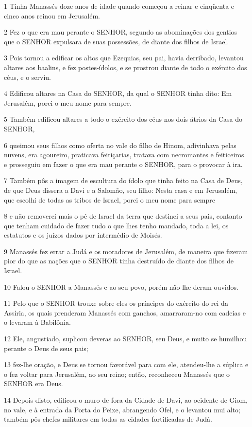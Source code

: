 \par 1 Tinha Manassés doze anos de idade quando começou a reinar e cinqüenta e cinco anos reinou em Jerusalém.
\par 2 Fez o que era mau perante o SENHOR, segundo as abominações dos gentios que o SENHOR expulsara de suas possessões, de diante dos filhos de Israel.
\par 3 Pois tornou a edificar os altos que Ezequias, seu pai, havia derribado, levantou altares aos baalins, e fez postes-ídolos, e se prostrou diante de todo o exército dos céus, e o serviu.
\par 4 Edificou altares na Casa do SENHOR, da qual o SENHOR tinha dito: Em Jerusalém, porei o meu nome para sempre.
\par 5 Também edificou altares a todo o exército dos céus nos dois átrios da Casa do SENHOR,
\par 6 queimou seus filhos como oferta no vale do filho de Hinom, adivinhava pelas nuvens, era agoureiro, praticava feitiçarias, tratava com necromantes e feiticeiros e prosseguiu em fazer o que era mau perante o SENHOR, para o provocar à ira.
\par 7 Também pôs a imagem de escultura do ídolo que tinha feito na Casa de Deus, de que Deus dissera a Davi e a Salomão, seu filho: Nesta casa e em Jerusalém, que escolhi de todas as tribos de Israel, porei o meu nome para sempre
\par 8 e não removerei mais o pé de Israel da terra que destinei a seus pais, contanto que tenham cuidado de fazer tudo o que lhes tenho mandado, toda a lei, os estatutos e os juízos dados por intermédio de Moisés.
\par 9 Manassés fez errar a Judá e os moradores de Jerusalém, de maneira que fizeram pior do que as nações que o SENHOR tinha destruído de diante dos filhos de Israel.
\par 10 Falou o SENHOR a Manassés e ao seu povo, porém não lhe deram ouvidos.
\par 11 Pelo que o SENHOR trouxe sobre eles os príncipes do exército do rei da Assíria, os quais prenderam Manassés com ganchos, amarraram-no com cadeias e o levaram à Babilônia.
\par 12 Ele, angustiado, suplicou deveras ao SENHOR, seu Deus, e muito se humilhou perante o Deus de seus pais;
\par 13 fez-lhe oração, e Deus se tornou favorável para com ele, atendeu-lhe a súplica e o fez voltar para Jerusalém, ao seu reino; então, reconheceu Manassés que o SENHOR era Deus.
\par 14 Depois disto, edificou o muro de fora da Cidade de Davi, ao ocidente de Giom, no vale, e à entrada da Porta do Peixe, abrangendo Ofel, e o levantou mui alto; também pôs chefes militares em todas as cidades fortificadas de Judá.

